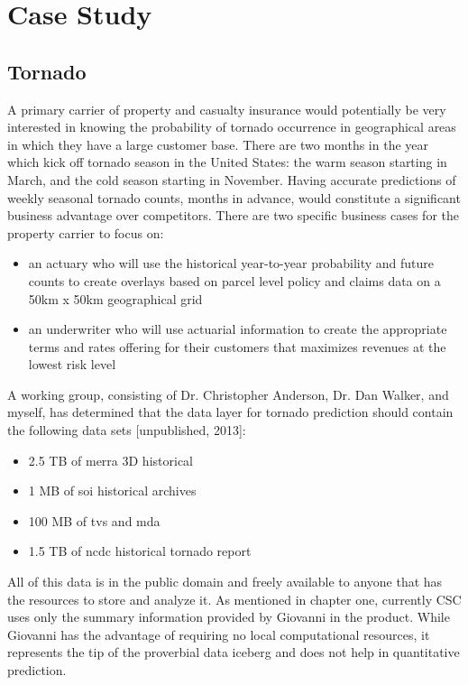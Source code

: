 

\chapter{Case Study}
\section*{Tornado}
A primary carrier of property and casualty insurance would potentially be very interested in knowing the probability of tornado occurrence in geographical areas in which they have a large customer base. There are two months in the year which kick off tornado season in the United States: the warm season starting in March, and the cold season starting in November. Having accurate predictions of weekly seasonal tornado counts, months in advance, would constitute a significant business advantage over competitors. There are two specific business cases for the property carrier to focus on:
\begin{itemize}
    \item an actuary who will use the historical year-to-year probability and future counts to create overlays based on parcel level policy and claims data on a 50km x 50km geographical grid
    \item an underwriter who will use actuarial information to create the appropriate terms and rates offering for their customers that maximizes revenues at the lowest risk level
\end{itemize}
A working group, consisting of Dr. Christopher Anderson, Dr. Dan Walker, and myself, has determined that the data layer for tornado prediction should contain the following data sets [unpublished, 2013]:
\begin{itemize}
    \item 2.5 TB of \gls{merra} 3D historical \cite{mdisc}
    \item 1 MB of \gls{soi} historical archives \cite{bom}
    \item 100 MB of \gls{tvs} and \gls{mda} \cite{hdss}
    \item 1.5 TB of \gls{ncdc} historical tornado report \cite{ncdc}
\end{itemize}
All of this data is in the public domain and freely available to anyone that has the resources to store and analyze it. As mentioned in chapter one, currently CSC uses only the summary information provided by Giovanni in the \climatedge product. While Giovanni has the advantage of requiring no local computational resources, it represents the tip of the proverbial data iceberg and does not help in quantitative prediction.\\


